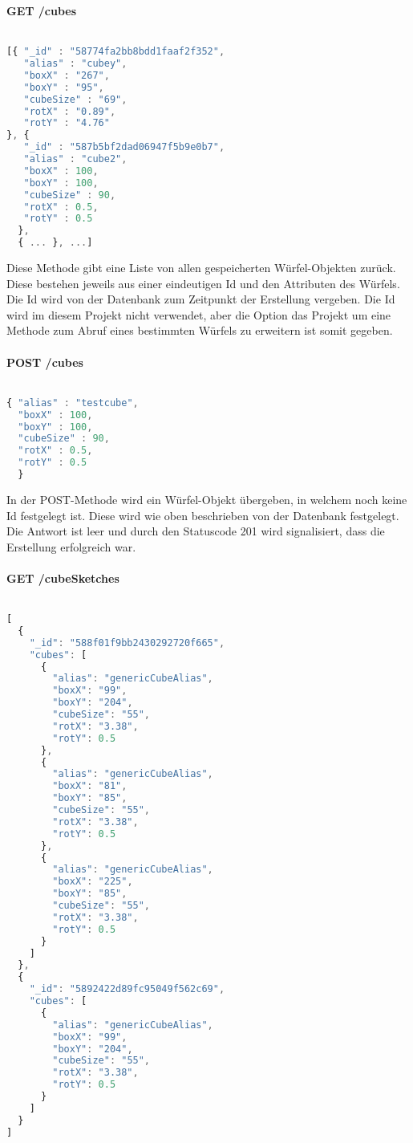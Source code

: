 \documentclass[12pt, ngerman, utf8]{article}
\begin{document}
\textbf{GET /cubes}\\\\
\begin{lstlisting}[language=JavaScript, caption={Response-Body der GET-Operation auf "/cubes"},label={cubesget}]
[{ "_id" : "58774fa2bb8bdd1faaf2f352",
   "alias" : "cubey",
   "boxX" : "267",
   "boxY" : "95",
   "cubeSize" : "69",
   "rotX" : "0.89",
   "rotY" : "4.76"
}, { 
   "_id" : "587b5bf2dad06947f5b9e0b7",
   "alias" : "cube2",
   "boxX" : 100,
   "boxY" : 100,
   "cubeSize" : 90,
   "rotX" : 0.5,
   "rotY" : 0.5
  }, 
  { ... }, ...]
\end{lstlisting}
Diese Methode gibt eine Liste von allen gespeicherten Würfel-Objekten zurück. Diese bestehen jeweils aus einer eindeutigen Id und den Attributen des Würfels. Die Id wird von der Datenbank zum Zeitpunkt der Erstellung vergeben. Die Id wird im diesem Projekt nicht verwendet, aber die Option das Projekt um eine Methode zum Abruf eines bestimmten Würfels zu erweitern ist somit gegeben.
\\\\
\textbf{POST /cubes}\\\\
\begin{lstlisting}[language=JavaScript, caption={Request-Body der POST-Operation auf "/cubes"},label={cubespost}]
{ "alias" : "testcube",
  "boxX" : 100,
  "boxY" : 100,
  "cubeSize" : 90,
  "rotX" : 0.5,
  "rotY" : 0.5 
  }
\end{lstlisting}
In der POST-Methode wird ein Würfel-Objekt übergeben, in welchem noch keine Id festgelegt ist. Diese wird wie oben beschrieben von der Datenbank festgelegt. Die Antwort ist leer und durch den Statuscode 201 wird signalisiert, dass die Erstellung erfolgreich war.
\\\\
\textbf{GET /cubeSketches}\\\\
\begin{lstlisting}[language=JavaScript, caption={Response-Body der POST-Operation auf "/cubeSketches"},label={sketchget}]
[
  {
    "_id": "588f01f9bb2430292720f665",
    "cubes": [
      {
        "alias": "genericCubeAlias",
        "boxX": "99",
        "boxY": "204",
        "cubeSize": "55",
        "rotX": "3.38",
        "rotY": 0.5
      },
      {
        "alias": "genericCubeAlias",
        "boxX": "81",
        "boxY": "85",
        "cubeSize": "55",
        "rotX": "3.38",
        "rotY": 0.5
      },
      {
        "alias": "genericCubeAlias",
        "boxX": "225",
        "boxY": "85",
        "cubeSize": "55",
        "rotX": "3.38",
        "rotY": 0.5
      }
    ]
  },
  {
    "_id": "5892422d89fc95049f562c69",
    "cubes": [
      {
        "alias": "genericCubeAlias",
        "boxX": "99",
        "boxY": "204",
        "cubeSize": "55",
        "rotX": "3.38",
        "rotY": 0.5
      }
    ]
  }
]
\end{lstlisting}
\end{document}

